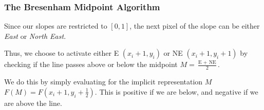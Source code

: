 \documentclass[english]{panikzettel}
\begin{document}
\begin{halfboxl}
\vspace{-\baselineskip}
\subsubsection*{The Bresenham Midpoint Algorithm}



\begin{minipage}{0.77\textwidth}
Since our slopes are restricted to $[0,1]$, the next pixel of the slope can be either \emph{East} or \emph{North East}.
\end{minipage}%
\begin{minipage}{0.03\textwidth}
\begin{center}

\end{center}
\end{minipage}%
\begin{minipage}{0.2\textwidth}
\begin{center}
\end{center}
\end{minipage}

Thus, we choose to activate either E $(x_i + 1, y_i)$ or NE $(x_i + 1, y_i + 1)$ by checking if the line passes above or below the midpoint $M = \frac{\text{E } + \text{ NE}}{2}$.

We do this by simply evaluating for the implicit representation $M$ $F(M) = F(x_i + 1, y_i + \frac{1}{2})$. This is positive if we are below, and negative if we are above the line.


\end{halfboxl}%
\end{document}
